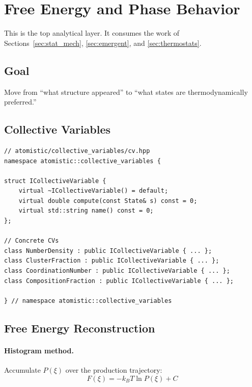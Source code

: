 \documentclass[11pt]{article}
\begin{document}
\section{Free Energy and Phase Behavior}
\label{sec:free_energy}

This is the top analytical layer.  It consumes the work of
Sections~\ref{sec:stat_mech}, \ref{sec:emergent}, and \ref{sec:thermostats}.

\subsection{Goal}

Move from ``what structure appeared'' to ``what states are thermodynamically
preferred.''

\subsection{Collective Variables}

\begin{lstlisting}
// atomistic/collective_variables/cv.hpp
namespace atomistic::collective_variables {

struct ICollectiveVariable {
    virtual ~ICollectiveVariable() = default;
    virtual double compute(const State& s) const = 0;
    virtual std::string name() const = 0;
};

// Concrete CVs
class NumberDensity : public ICollectiveVariable { ... };
class ClusterFraction : public ICollectiveVariable { ... };
class CoordinationNumber : public ICollectiveVariable { ... };
class CompositionFraction : public ICollectiveVariable { ... };

} // namespace atomistic::collective_variables
\end{lstlisting}

\subsection{Free Energy Reconstruction}

\paragraph{Histogram method.}

Accumulate $P(\xi)$ over the production trajectory:
\begin{equation}
  F(\xi) = -k_B T \ln P(\xi) + C
\end{equation}
\end{document}

